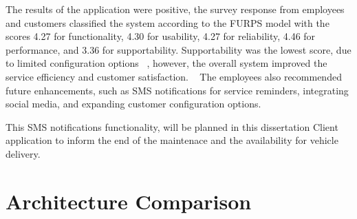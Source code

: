 The results of the application were positive, the survey response from employees and customers classified the system according to the \ac{FURPS} model with the scores 4.27 for functionality, 4.30 for usability, 4.27 for reliability, 4.46 for performance, and 3.36 for supportability.
Supportability was the lowest score, due to limited configuration options ~\cite{MAS_MOTORS}, however, the overall system improved the service efficiency and customer satisfaction. ~\cite{MAS_MOTORS}
The employees also recommended future enhancements, such as SMS notifications for service reminders, integrating social media, and expanding customer configuration options.

This SMS notifications functionality, will be planned in this dissertation Client application to inform the end of the maintenace and the availability for vehicle delivery.  


\section{Architecture Comparison}



